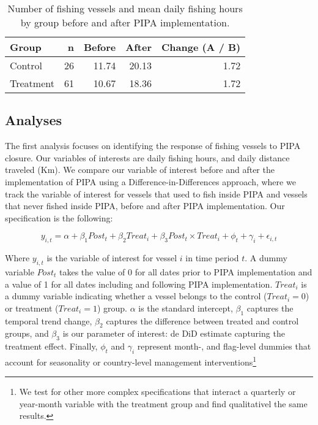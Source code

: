 \documentclass[11pt,]{article}
\let\rmarkdownfootnote\footnote%
\def\footnote{\protect\rmarkdownfootnote}
\begin{document}
\begin{table}[H]

\caption{\label{tab:unnamed-chunk-6}\label{tab:baci_n_s}Number of fishing vessels and mean daily fishing hours by group before and after PIPA implementation.}
\centering
\begin{tabular}[t]{lrrrr}
\toprule
Group & n & Before & After & Change (A / B)\\
\midrule
Control & 26 & 11.74 & 20.13 & 1.72\\
Treatment & 61 & 10.67 & 18.36 & 1.72\\
\bottomrule
\end{tabular}
\end{table}

\hypertarget{analyses}{%
\subsection{Analyses}\label{analyses}}

The first analysis focuses on identifying the response of fishing
vessels to PIPA closure. Our variables of interests are daily fishing
hours, and daily distance traveled (Km). We compare our variable of
interest before and after the implementation of PIPA using a
Difference-in-Differences approach, where we track the variable of
interest for vessels that used to fish inside PIPA and vessels that
never fished inside PIPA, before and after PIPA implementation. Our
specification is the following:

\[
y_{i,t} = \alpha + \beta_1 Post_t + \beta_2 Treat_i + \beta_3 Post_t \times Treat_i + \phi_t + \gamma_i + \epsilon_{i,t}
\]

Where \(y_{i,t}\) is the variable of interest for vessel \(i\) in time
period \(t\). A dummy variable \(Post_t\) takes the value of 0 for all
dates prior to PIPA implementation and a value of 1 for all dates
including and following PIPA implementation. \(Treat_i\) is a dummy
variable indicating whether a vessel belongs to the control
(\(Treat_i = 0\)) or treatment (\(Treat_i = 1\)) group. \(\alpha\) is
the standard intercept, \(\beta_1\) captures the temporal trend change,
\(\beta_2\) captures the difference between treated and control groups,
and \(\beta_3\) is our parameter of interest: de DiD estimate capturing
the treatment effect. Finally, \(\phi_t\) and \(\gamma_i\) represent
month-, and flag-level dummies that account for seasonality or
country-level management
interventions\footnote{We test for other more complex specifications that interact a quarterly or year-month variable with the treatment group and find qualitativel the same results.}
\end{document}
